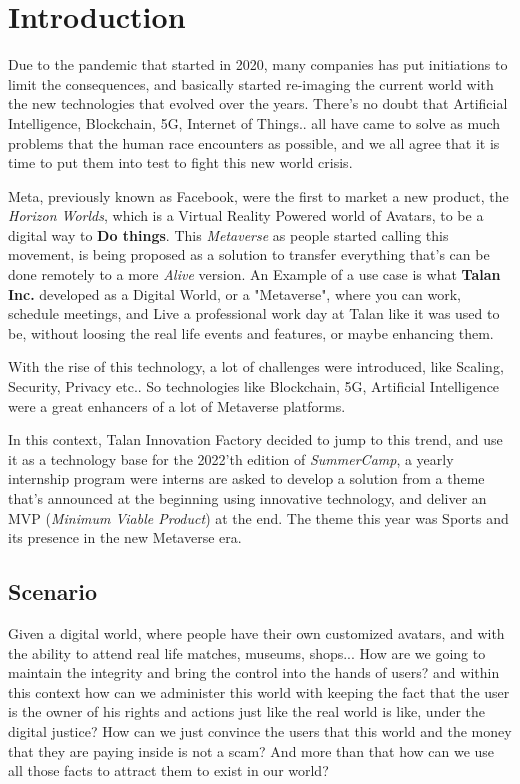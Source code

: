 \chapter{Introduction}


\indent Due to the pandemic that started in 2020, many companies has put initiations to limit the consequences, and basically started re-imaging the current world with the new technologies that evolved over the years. There's no doubt that Artificial Intelligence, Blockchain, 5G, Internet of Things.. all have came to solve as much problems that the human race encounters as  possible, and we all agree that it is time to put them into test to fight this new world crisis. 
\bigskip

\indent Meta,  previously known as Facebook, were the first to market a new product, the \textit{Horizon Worlds}, which is a Virtual Reality Powered world of Avatars, to be a digital way to \textbf{Do things}. This \textit{Metaverse} as people started calling this movement, is being proposed as a solution to transfer everything that's can be done remotely to a more \textit{Alive} version. An Example of a use case is what \textbf{Talan Inc.} developed as a Digital World, or a "Metaverse", where you can work, schedule meetings, and Live a professional work day at Talan like it was used to be, without loosing the real life events and features, or maybe enhancing them.
\bigskip

\indent With the rise of this technology, a lot of challenges were introduced, like Scaling, Security, Privacy etc.. So technologies like Blockchain, 5G, Artificial Intelligence were a great enhancers of a lot of Metaverse platforms.
\bigskip

\indent In this context, Talan Innovation Factory decided to jump to this trend, and use it as a technology base for the 2022'th edition of \textit{SummerCamp}, a yearly internship program were interns are asked to develop a solution from a theme that's announced at the beginning using innovative technology, and deliver an MVP (\textit{Minimum Viable Product}) at the end. The theme this year was Sports and its presence in the new Metaverse era.  

\section{Scenario}
Given a digital world, where people have their own customized avatars, and with the ability to attend real life matches, museums, shops... How are we going to maintain the integrity and bring the control into the hands of users? and within this context how can we administer this world with keeping the fact that the user is the owner of his rights and actions just like the real world is like, under the digital justice? How can we just convince the users that this world and the money that they are paying inside is not a scam? And more than that how can we use all those facts to attract them to exist in our world?

